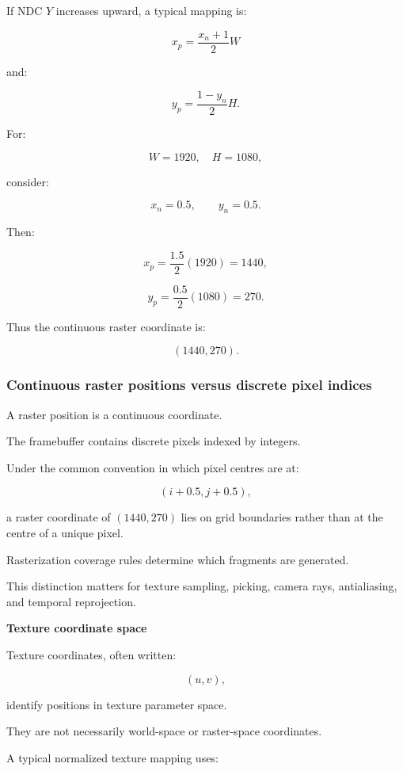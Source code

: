 If NDC \(Y\) increases upward, a typical mapping is:

\[
 \boxed{ x_p=\frac{x_n+1}{2}W }
\]

and:

\[
 \boxed{ y_p=\frac{1-y_n}{2}H }.
\]

For:

\[
 W=1920,\quad H=1080,
\]

consider:

\[
 x_n=0.5,\qquad y_n=0.5.
\]

Then:

\[
 x_p=\frac{1.5}{2}(1920)=1440,
\]

\[
 y_p=\frac{0.5}{2}(1080)=270.
\]

Thus the continuous raster coordinate is:

\[
 \boxed{(1440,270)}.
\]

\subsubsection{Continuous raster positions versus discrete pixel indices}\label{02-foundations-ii-ch032-continuous-raster-positions-versus-discrete-pixel-indices}

\hypertarget{02-foundations-ii-ch032-continuous-raster-positions-versus-discrete-pixel-indices}{}

A raster position is a continuous coordinate.

The framebuffer contains discrete pixels indexed by integers.

Under the common convention in which pixel centres are at:

\[
 (i+0.5,j+0.5),
\]

a raster coordinate of \((1440,270)\) lies on grid boundaries rather than at the centre of a unique pixel.

Rasterization coverage rules determine which fragments are generated.

This distinction matters for texture sampling, picking, camera rays, antialiasing, and temporal reprojection.

\textbf{Texture coordinate space}

Texture coordinates, often written:

\[
 (u,v),
\]

identify positions in texture parameter space.

They are not necessarily world-space or raster-space coordinates.

A typical normalized texture mapping uses:

